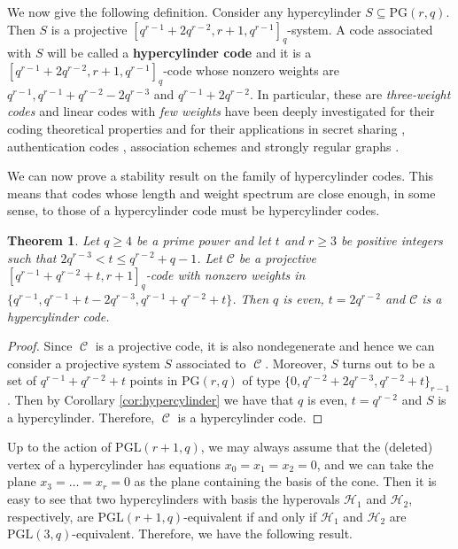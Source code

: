 \documentclass[11pt]{amsart}
\DeclareMathOperator{\C}{\mathcal{C}}
\newtheorem{theorem}{Theorem}[section]
\newcommand{\PG}{\mathrm{PG}}
\begin{document}
We now give the following definition. Consider any hypercylinder $S\subseteq \PG(r,q)$. Then $S$ is a projective $[q^{r-1}+2q^{r-2},r+1,q^{r-1}]_q$-system.
A code associated with $S$ will be called a \textbf{hypercylinder code} and it is a $[q^{r-1}+2q^{r-2},r+1,q^{r-1}]_q$-code whose nonzero weights are $q^{r-1},q^{r-1}+q^{r-2}-2q^{r-3}$ and $q^{r-1}+2q^{r-2}$. In particular, these are \emph{three-weight codes} and linear codes with \emph{few weights} have been deeply investigated for their coding theoretical properties and for their applications in secret sharing \cite{carlet2005linear}, authentication codes \cite{ding2005coding}, association schemes \cite{calderbank1984three} and strongly regular graphs \cite{calderbank1986geometry}.

We can now prove a stability result on the family of hypercylinder codes.
This means that codes whose length and weight spectrum are close enough, in some sense, to those of a hypercylinder code must be hypercylinder codes.

\begin{theorem}
Let $q\geq 4$ be a prime power and let $t$ and $r\geq 3$ be positive integers such that $2q^{r-3}<t \leq q^{r-2}+q-1$. Let $\mathcal{C}$ be a projective $[q^{r-1}+q^{r-2}+t,r+1]_q$-code with nonzero weights in $\{q^{r-1}, q^{r-1}+t-2q^{r-3},q^{r-1}+q^{r-2}+t\}$. Then $q$ is even, $t=2q^{r-2}$ and $\mathcal{C}$ is a hypercylinder code.
\end{theorem}
\begin{proof}
Since $\C$ is a projective code, it is also nondegenerate and hence we can consider a projective system $S$ associated to $\C$. Moreover, $S$ turns out to be a set of $q^{r-1}+q^{r-2}+t$ points in $\PG(r,q)$ of type $\{0,q^{r-2}+2q^{r-3},q^{r-2}+t\}_{r-1}$. Then by Corollary \ref{cor:hypercylinder} we have that $q$ is even, $t=q^{r-2}$ and $S$ is a hypercylinder. Therefore, $\C$ is a hypercylinder code.
\end{proof}

Up to the action of $\mathrm{PGL}(r+1,q)$, we may always assume that the (deleted) vertex of a hypercylinder has equations $x_0=x_1=x_2=0$, and we can take the plane $x_3 = \ldots = x_r = 0$ as the plane containing the basis of the cone.
Then it is easy to see that two hypercylinders with basis the hyperovals $\mathcal{H}_1$ and $\mathcal{H}_2$, respectively, are $\mathrm{PGL}(r+1,q)$-equivalent if and only if $\mathcal{H}_1$ and $\mathcal{H}_2$ are $\mathrm{PGL}(3,q)$-equivalent.
Therefore, we have the following result.
\end{document}
